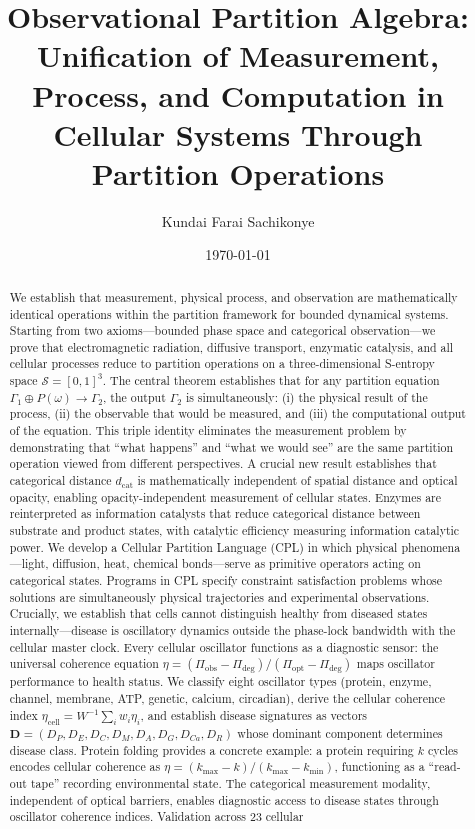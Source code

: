 \documentclass[aps,prd,twocolumn,superscriptaddress,floatfix,nofootinbib]{revtex4-2}
\theoremstyle{remark}
\newcommand{\Sspace}{\mathcal{S}}
\newcommand{\Pop}{P}
\newcommand{\Gstate}{\Gamma}
\newcommand{\dcat}{d_{\mathrm{cat}}}
\begin{document}
\title{Observational Partition Algebra: Unification of Measurement, Process, and Computation in Cellular Systems Through Partition Operations}

\author{Kundai Farai Sachikonye}

\date{\today}

\begin{abstract}
We establish that measurement, physical process, and observation are mathematically identical operations within the partition framework for bounded dynamical systems. Starting from two axioms---bounded phase space and categorical observation---we prove that electromagnetic radiation, diffusive transport, enzymatic catalysis, and all cellular processes reduce to partition operations on a three-dimensional S-entropy space $\Sspace = [0,1]^3$. The central theorem establishes that for any partition equation $\Gstate_1 \oplus \Pop(\omega) \to \Gstate_2$, the output $\Gstate_2$ is simultaneously: (i) the physical result of the process, (ii) the observable that would be measured, and (iii) the computational output of the equation. This triple identity eliminates the measurement problem by demonstrating that ``what happens'' and ``what we would see'' are the same partition operation viewed from different perspectives. A crucial new result establishes that categorical distance $\dcat$ is mathematically independent of spatial distance and optical opacity, enabling opacity-independent measurement of cellular states. Enzymes are reinterpreted as information catalysts that reduce categorical distance between substrate and product states, with catalytic efficiency measuring information catalytic power. We develop a Cellular Partition Language (CPL) in which physical phenomena---light, diffusion, heat, chemical bonds---serve as primitive operators acting on categorical states. Programs in CPL specify constraint satisfaction problems whose solutions are simultaneously physical trajectories and experimental observations. Crucially, we establish that cells cannot distinguish healthy from diseased states internally---disease is oscillatory dynamics outside the phase-lock bandwidth with the cellular master clock. Every cellular oscillator functions as a diagnostic sensor: the universal coherence equation $\eta = (\Pi_{\mathrm{obs}} - \Pi_{\mathrm{deg}})/(\Pi_{\mathrm{opt}} - \Pi_{\mathrm{deg}})$ maps oscillator performance to health status. We classify eight oscillator types (protein, enzyme, channel, membrane, ATP, genetic, calcium, circadian), derive the cellular coherence index $\eta_{\mathrm{cell}} = W^{-1}\sum_i w_i\eta_i$, and establish disease signatures as vectors $\mathbf{D} = (D_P, D_E, D_C, D_M, D_A, D_G, D_{Ca}, D_R)$ whose dominant component determines disease class. Protein folding provides a concrete example: a protein requiring $k$ cycles encodes cellular coherence as $\eta = (k_{\max} - k)/(k_{\max} - k_{\min})$, functioning as a ``read-out tape'' recording environmental state. The categorical measurement modality, independent of optical barriers, enables diagnostic access to disease states through oscillator coherence indices. Validation across 23 cellular 
\end{abstract}
\end{document}
